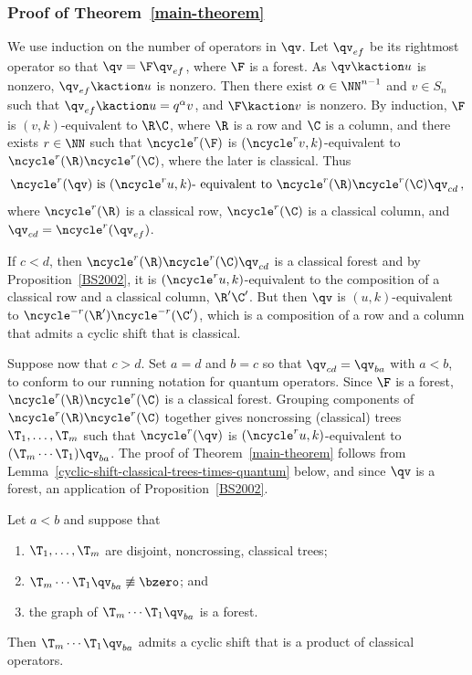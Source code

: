 \subsubsection{Proof of Theorem~\ref{main-theorem}}

We use induction on the number of operators in $\qv$.
Let $\qv_{ef}$ be its rightmost operator so that $\qv=\F \qv_{ef}$, where $\F$ is a forest.
As $\qv\kaction u$ is nonzero, $\qv_{ef}\kaction u$ is nonzero.
Then there exist $\alpha\in\NN^{n-1}$ and $v\in S_n$ such that $\qv_{ef}\kaction u=q^\alpha v$, and
$\F\kaction v$ is nonzero.
By induction, $\F$ is $(v,k)$-equivalent to $\R\C$, where $\R$ is a row and $\C$ is a column, and
there exists $r \in \NN$ such that $\ncycle^r(\F)$ is $(\ncycle^r v, k)$-equivalent to $\ncycle^r(\R)\ncycle^r(\C)$, where the later is
classical. 
Thus
\begin{equation*}
    \ncycle^r(\qv) \text{ is } (\ncycle^r u,k)\text{- equivalent to } \ncycle^r(\R)\ncycle^r(\C)\qv_{cd}\,,
\end{equation*}
where $\ncycle^r(\R)$ is a classical row, $\ncycle^r(\C)$ is a classical column, and $\qv_{cd}=\ncycle^r(\qv_{ef})$.

If  $c<d$, then $\ncycle^r(\R)\ncycle^r(\C)\qv_{cd}$ is a classical forest and by
Proposition~\ref{BS2002}, it is $(\ncycle^r u, k)$-equivalent to the composition of a 
classical row and a classical column, $\R' \C'$.
But then $\qv$ is $(u, k)$-equivalent to $\ncycle^{-r}(\R')\ncycle^{-r}(\C')$, which is a composition of a row and a column that admits a cyclic
shift that is classical. 

Suppose now that $c>d$.
Set $a=d$ and $b=c$ so that $\qv_{cd}=\qv_{ba}$ with $a<b$, to conform to our running notation for quantum operators.
Since $\F$ is a forest,  $\ncycle^r(\R)\ncycle^r(\C)$ is a classical forest.
Grouping components of $\ncycle^r(\R)\ncycle^r(\C)$ together gives  noncrossing (classical) trees $\T_1,\dotsc,\T_m$ such that
$\ncycle^r(\qv)$ is $(\ncycle^r u, k)$-equivalent to $(\T_m\dotsb\T_1)\qv_{ba}$.
The proof of Theorem~\ref{main-theorem} follows from Lemma~\ref{cyclic-shift-classical-trees-times-quantum} below,
and since $\qv$ is a forest, an application of Proposition~\ref{BS2002}.

\begin{lemma}
    \label{cyclic-shift-classical-trees-times-quantum}
    Let $a<b$  and suppose that
    \begin{enumerate}[label={{\rm(\roman*)}}]
        \item
            $\T_1, \ldots, \T_m$ are disjoint, noncrossing, classical trees;

        \item
            $\T_m \cdots \T_1 \qv_{ba} \not\equiv \bzero$; and 

        \item
            the graph of $\T_m \cdots \T_1 \qv_{ba}$ is a forest.
    \end{enumerate}
    Then $\T_m \cdots \T_1 \qv_{ba}$
    admits a cyclic shift that is a product of classical operators.
\end{lemma}

